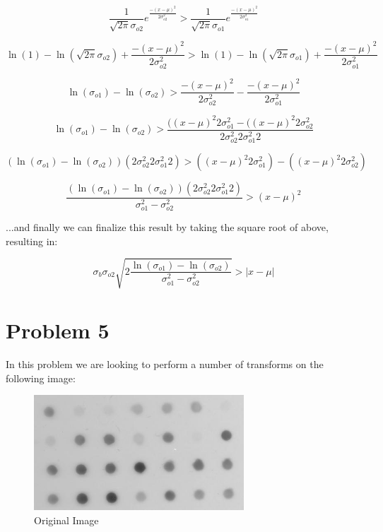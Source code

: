 \documentclass{article}
\begin{document}
\begin {equation}
    \frac{1}{\sqrt{2\pi}\sigma_{o2}}e^{\frac{-(x-\mu)^2}{2\sigma^2_{o2}}}
    >
    \frac{1}{\sqrt{2\pi}\sigma_{o1}}e^{\frac{-(x-\mu)^2}{2\sigma^2_{o1}}}
\end{equation}


\begin{equation}
    \ln(1) - \ln(\sqrt{2\pi}\sigma_{o2}) + \frac{-(x-\mu)^2}{2\sigma^2_{o2}}
    >
    \ln(1) - \ln(\sqrt{2\pi}\sigma_{o1}) + \frac{-(x-\mu)^2}{2\sigma^2_{o1}}
\end{equation}

\begin{equation}
    \ln(\sigma_{o1}) - \ln(\sigma_{o2}) > \frac{-(x-\mu)^2}{2\sigma^2_{o2}} - \frac{-(x-\mu)^2}{2\sigma^2_{o1}}
\end{equation}

\begin{equation}
    \ln(\sigma_{o1}) - \ln(\sigma_{o2}) > \frac{((x-\mu)^2 2\sigma_{o1}^2 - ((x-\mu)^2 2\sigma_{o2}^2 }{2\sigma^2_{o2}2 \sigma^2_{o1}2}
\end{equation}

\begin{equation}
    (\ln(\sigma_{o1}) - \ln(\sigma_{o2})) (2\sigma^2_{o2}2 \sigma^2_{o1}2)  > ((x-\mu)^2 2\sigma_{o1}^2) - ((x-\mu)^2 2\sigma_{o2}^2)
\end{equation}

\begin{equation}
    \frac{(\ln(\sigma_{o1}) - \ln(\sigma_{o2})) (2\sigma^2_{o2}2 \sigma^2_{o1}2)}{\sigma_{o1}^2 - \sigma_{o2}^2} > (x - \mu)^2
\end{equation}

...and finally we can finalize this result by taking the square root of above, resulting in:

\begin{equation}
    \sigma_b \sigma_{o2} \sqrt{2\frac{\ln(\sigma_{o1}) - \ln(\sigma_{o2})}{\sigma_{o1}^2 - \sigma_{o2}^2}} > \vert x - \mu \vert
\end{equation}

\section*{Problem 5}

In this problem we are looking to perform a number of transforms on the following image:

\begin{figure}[H]
    \centering
    \includegraphics[width = 0.7\textwidth]{imgs/dot-blot.jpg}
    \caption{Original Image}
    \label{fig:prob5}
\end{figure}
\end{document}
